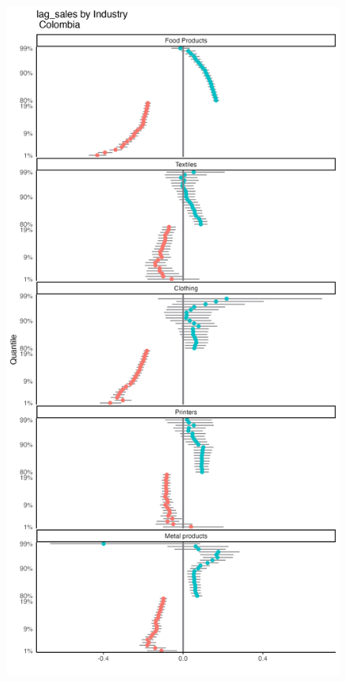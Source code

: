 \documentclass[
  12pt]{article}
\theoremstyle{definition}
\theoremstyle{remark}
\begin{document}
\begin{figure}

{\centering \includegraphics[width=\textwidth,height=1\textheight]{../Results/Figures/Colombia/lag_sales_by_inds_diff.png}

}

\end{figure}
\end{document}

